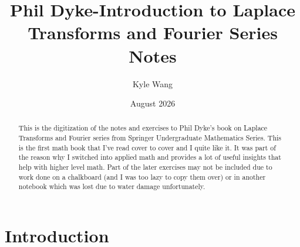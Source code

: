 \documentclass{report}
\title{Phil Dyke-Introduction to Laplace Transforms and Fourier Series Notes}
\author{Kyle Wang}
\date{August 2026}
\theoremstyle{definition}
\theoremstyle{remark}
\begin{document}
\maketitle
\newpage
\tableofcontents
\newpage
\begin{abstract}
    This is the digitization of the notes and exercises to Phil Dyke's book on Laplace Transforms and Fourier series from Springer Undergraduate Mathematics Series. This is the first math book that I've read cover to cover and I quite like it. It was part of the reason why I switched into applied math and provides a lot of useful insights that help with higher level math. Part of the later exercises may not be included due to work done on a chalkboard (and I was too lazy to copy them over) or in another notebook which was lost due to water damage unfortunately.
\end{abstract}
\newpage
\chapter{Introduction}
\end{document}
